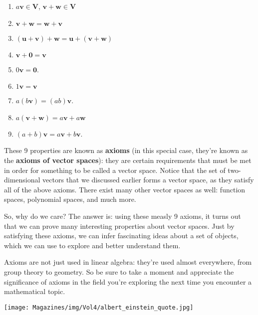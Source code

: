 \documentclass{article}
\begin{document}
\begin{enumerate}
    \item $a\mathbf{v}\in\mathbf{V}$, $\mathbf{v}+\mathbf{w}\in\mathbf{V}$

    \item $\mathbf{v}+\mathbf{w}=\mathbf{w}+\mathbf{v}$

    \item $(\mathbf{u}+\mathbf{v})+\mathbf{w}=\mathbf{u}+(\mathbf{v}+\mathbf{w})$

    \item $\mathbf{v}+\mathbf{0}=\mathbf{v}$

    \item $0\mathbf{v}=\mathbf{0}$.

    \item $1\mathbf{v}=\mathbf{v}$

    \item $a(b\mathbf{v})=(ab)\mathbf{v}$.

    \item $a(\mathbf{v}+\mathbf{w})=a\mathbf{v}+a\mathbf{w}$

    \item $(a+b)\mathbf{v}=a\mathbf{v}+b\mathbf{v}$.
\end{enumerate}

These 9 properties are known as \textbf{axioms} (in this special case, they're known as the \textbf{axioms of vector spaces}): they are certain requirements that must be met in order for something to be called a vector space. Notice that the set of two-dimensional vectors that we discussed earlier forms a vector space, as they satisfy all of the above axioms. There exist many other vector spaces as well: function spaces, polynomial spaces, and much more.

So, why do we care? The answer is: using these measly 9 axioms, it turns out that we can prove many interesting properties about vector spaces. Just by satisfying these axioms, we can infer fascinating ideas about a set of objects, which we can use to explore and better understand them.

Axioms are not just used in linear algebra: they're used almost everywhere, from group theory to geometry. So be sure to take a moment and appreciate the significance of axioms in the field you're exploring the next time you encounter a mathematical topic.

\begin{center}
\texttt{[image: Magazines/img/Vol4/albert\_einstein\_quote.jpg]}
\end{center}
\end{document}
